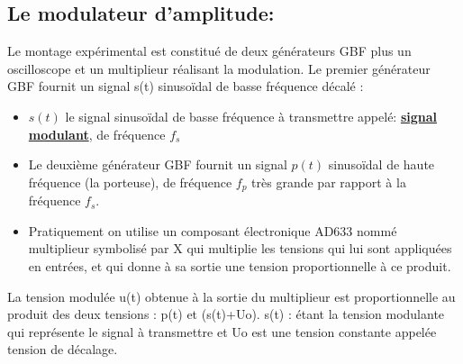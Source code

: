\documentclass[12pt]{article}
\begin{document}
\subsection{Le modulateur d'amplitude: }

Le montage expérimental est constitué de deux générateurs GBF plus un oscilloscope et un multiplieur réalisant la modulation.
Le premier générateur GBF fournit un signal s(t) sinusoïdal de basse fréquence décalé :




\begin{itemize}
	\item $s(t)$ le signal sinusoïdal de basse fréquence à transmettre appelé: \underline{\textbf{signal modulant}}, de fréquence $f_s$
	\item Le deuxième générateur GBF fournit un signal $p(t)$ sinusoïdal de haute fréquence (la porteuse), de fréquence $f_p$ très grande par rapport à la fréquence $f_s$.
	\item Pratiquement on utilise un composant électronique AD633 nommé multiplieur symbolisé par X qui multiplie les tensions qui lui sont
appliquées en entrées, et qui donne à sa sortie une tension proportionnelle à ce produit. 

\end{itemize}


\begin{center}
\end{center}


La tension modulée u(t) obtenue à la sortie du multiplieur est proportionnelle au produit des deux tensions : p(t) et (s(t)+Uo).
s(t) : étant la tension modulante qui représente le signal à transmettre et Uo est une tension constante appelée tension de décalage.
\end{document}

